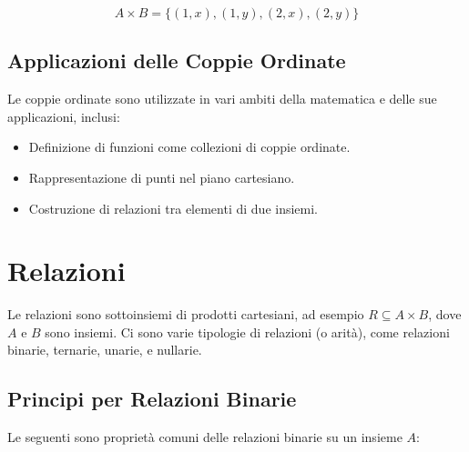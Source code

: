 \documentclass{article}
\begin{document}
\[ A \times B = \{(1, x), (1, y), (2, x), (2, y)\} \]

\subsection{Applicazioni delle Coppie Ordinate}

Le coppie ordinate sono utilizzate in vari ambiti della matematica e delle sue applicazioni, inclusi:

\begin{itemize}
    \item Definizione di funzioni come collezioni di coppie ordinate.
    \item Rappresentazione di punti nel piano cartesiano.
    \item Costruzione di relazioni tra elementi di due insiemi.
\end{itemize}
\newpage
\section{Relazioni}
Le relazioni sono sottoinsiemi di prodotti cartesiani, ad esempio $R \subseteq A \times B$, dove $A$ e $B$ sono insiemi. Ci sono varie tipologie di relazioni (o arità), come relazioni binarie, ternarie, unarie, e nullarie.

\subsection{Principi per Relazioni Binarie}
Le seguenti sono proprietà comuni delle relazioni binarie su un insieme $A$:
\end{document}
